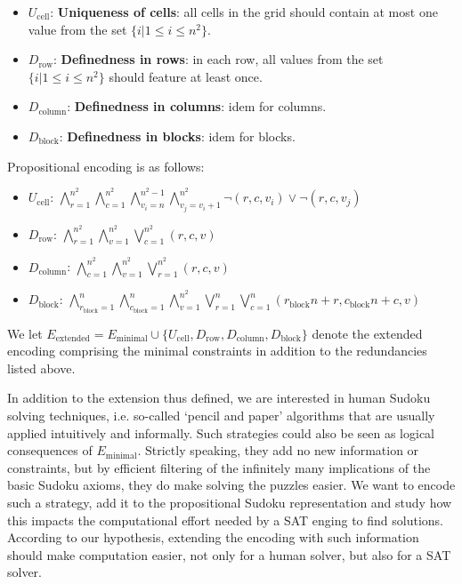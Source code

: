 \documentclass[10pt,a4paper,leqno]{article}
\newcommand{\ucell}{U_{\text{cell}}}
\newcommand{\drow}{D_{\text{row}}}
\newcommand{\dcol}{D_{\text{column}}}
\newcommand{\dblock}{D_{\text{block}}}
\begin{document}
\begin{itemize}

\item $\ucell$: \textbf{Uniqueness of cells}: all cells in the grid should contain at most one value from the set $\{i | 1 \leq i \leq n^2\}$.

\item $\drow$: \textbf{Definedness in rows}: in each row, all values from the set $\{i | 1 \leq i \leq n^2\}$ should feature at least once. 

\item $\dcol$: \textbf{Definedness in columns}: idem for columns. 

\item $\dblock$: \textbf{Definedness in blocks}: idem for blocks. 

\end{itemize}

Propositional encoding is as follows: 

\begin{itemize}

\item $\ucell$: 
$\bigwedge_{r=1}^{n^2} \bigwedge_{c=1}^{n^2}\bigwedge_{v_i=n}^{n^2 - 1} \bigwedge_{v_j=v_i+1}^{n^2} \neg(r,c,v_i) \lor \neg(r,c,v_j)$


\item $\drow$:
$\bigwedge_{r=1}^{n^2} \bigwedge_{v=1}^{n^2} \bigvee_{c=1}^{n^2} (r,c,v)$

\item $\dcol$: 
$\bigwedge_{c=1}^{n^2} \bigwedge_{v=1}^{n^2} \bigvee_{r=1}^{n^2} (r,c,v)$

\item $\dblock$:  
$\bigwedge_{r_{\text{block}} = 1}^{n} \bigwedge_{c_{\text{block}} = 1}^{n}\bigwedge_{v=1}^{n^2} \bigvee_{r = 1}^{n} \bigvee_{c = 1}^{n} (r_{\text{block}} n + r ,c_{\text{block}} n +c,v) $

\end{itemize}

We let $E_{\text{extended}} = E_{\text{minimal}} \cup \{\ucell,\drow,\dcol,\dblock\}$ denote the extended encoding comprising the minimal constraints in addition to the redundancies listed above. 

In addition to the extension thus defined, we are interested in human Sudoku solving techniques, i.e. so-called `pencil and paper' algorithms that are usually applied intuitively and informally. Such strategies could also be seen as logical consequences of $E_{\text{minimal}}$. Strictly speaking, they add no new information or constraints, but by efficient filtering of the infinitely many implications of the basic Sudoku axioms, they do make solving the puzzles easier. We want to encode such a strategy, add it to the propositional Sudoku representation and study how this impacts the computational effort needed by a SAT enging to find solutions. According to our hypothesis, extending the encoding with such information should make computation easier, not only for a human solver, but also for a SAT solver.
\end{document}

